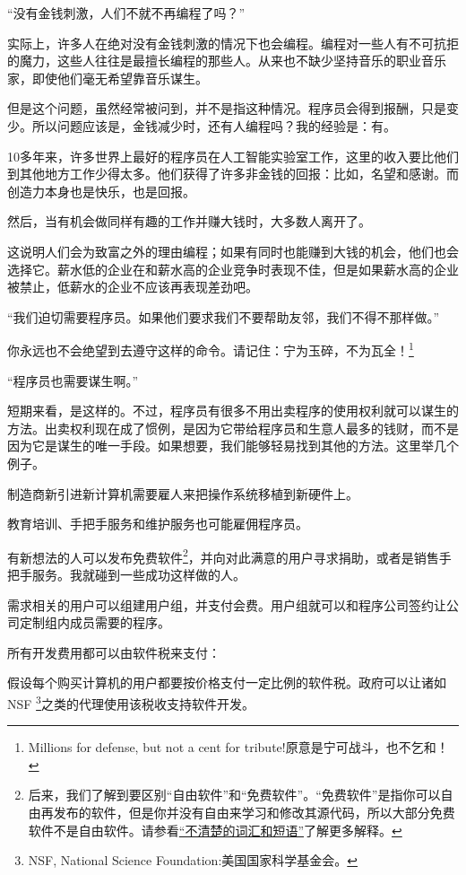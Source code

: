 \textsf{“没有金钱刺激，人们不就不再编程了吗？”}\par
实际上，许多人在绝对没有金钱刺激的情况下也会编程。编程对一些人有不可抗拒的魔力，这些人往往是最擅长编程的那些人。从来也不缺少坚持音乐的职业音乐家，即使他们毫无希望靠音乐谋生。\par
但是这个问题，虽然经常被问到，并不是指这种情况。程序员会得到报酬，只是变少。所以问题应该是，金钱减少时，还有人编程吗？我的经验是：有。\par
10多年来，许多世界上最好的程序员在人工智能实验室工作，这里的收入要比他们到其他地方工作少得太多。他们获得了许多非金钱的回报：比如，名望和感谢。而创造力本身也是快乐，也是回报。\par
然后，当有机会做同样有趣的工作并赚大钱时，大多数人离开了。\par
这说明人们会为致富之外的理由编程；如果有同时也能赚到大钱的机会，他们也会选择它。薪水低的企业在和薪水高的企业竞争时表现不佳，但是如果薪水高的企业被禁止，低薪水的企业不应该再表现差劲吧。\par
\textsf{“我们迫切需要程序员。如果他们要求我们不要帮助友邻，我们不得不那样做。”}\par
你永远也不会绝望到去遵守这样的命令。请记住：宁为玉碎，不为瓦全！\footnote{Millions for defense, but not a cent for tribute!原意是宁可战斗，也不乞和！}\par
\textsf{“程序员也需要谋生啊。”}\par
短期来看，是这样的。不过，程序员有很多不用出卖程序的使用权利就可以谋生的方法。出卖权利现在成了惯例，是因为它带给程序员和生意人最多的钱财，而不是因为它是谋生的唯一手段。如果想要，我们能够轻易找到其他的方法。这里举几个例子。\par
制造商新引进新计算机需要雇人来把操作系统移植到新硬件上。\par
教育培训、手把手服务和维护服务也可能雇佣程序员。\par
有新想法的人可以发布免费软件\footnote{后来，我们了解到要区别“自由软件”和“免费软件”。“免费软件”是指你可以自由再发布的软件，但是你并没有自由来学习和修改其源代码，所以大部分免费软件不是自由软件。请参看\href{http://www.gnu.org/philosophy/words-to-avoid.html \# GiveAwaySoftware}{“不清楚的词汇和短语”}了解更多解释。}，并向对此满意的用户寻求捐助，或者是销售手把手服务。我就碰到一些成功这样做的人。\par
需求相关的用户可以组建用户组，并支付会费。用户组就可以和程序公司签约让公司定制组内成员需要的程序。\par
所有开发费用都可以由软件税来支付：\par
假设每个购买计算机的用户都要按价格支付一定比例的软件税。政府可以让诸如NSF \footnote{NSF, National Science Foundation:美国国家科学基金会。}之类的代理使用该税收支持软件开发。\par
